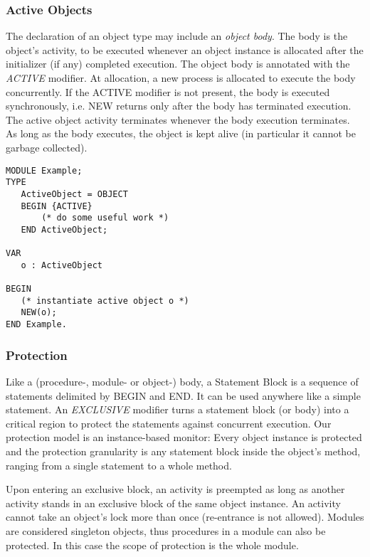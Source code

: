 \documentclass[a4paper,11pt]{article}
\begin{document}
\subsubsection{Active Objects}
The declaration of an object type may include an \emph{object body}. The body is the object's activity, to be executed whenever an object instance is allocated after the initializer (if any) completed execution. The object body is annotated with the \emph{ACTIVE} modifier. At allocation, a new process is allocated to execute the body concurrently.
If the ACTIVE modifier is not present, the body is executed synchronously, i.e. NEW returns only after the body has terminated execution.
The active object activity terminates whenever the body execution terminates. As long as the body executes, the object is kept alive (in particular it cannot be garbage collected).

\begin{lstlisting}[language=Oberon,frame=none,caption=Example of an active object]
MODULE Example;
TYPE
   ActiveObject = OBJECT
   BEGIN {ACTIVE}
       (* do some useful work *)
   END ActiveObject;

VAR
   o : ActiveObject

BEGIN
   (* instantiate active object o *)
   NEW(o);
END Example.
\end{lstlisting}

\subsubsection{Protection}
Like a (procedure-, module- or object-) body, a Statement Block is a sequence of statements delimited by BEGIN and END. It can be used anywhere like a simple statement. An {\em EXCLUSIVE} modifier turns a statement block (or body) into a critical region to protect the statements against concurrent execution. Our protection model is an instance-based monitor: Every object instance is protected and the protection granularity is any statement block inside the object's method, ranging from a single statement to a whole method.

Upon entering an exclusive block, an activity is preempted as long as another activity stands in an exclusive block
of the same object instance. An activity cannot take an object's lock more than once (re-entrance is not allowed).
Modules are considered singleton objects, thus procedures in a module can also be protected. In this case the scope of protection is the whole module.
\end{document}
